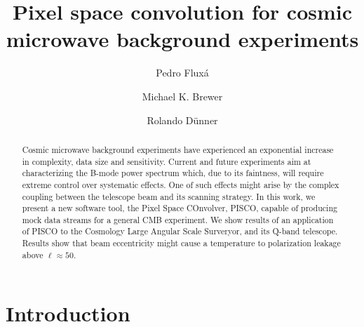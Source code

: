 \documentclass[a4paper,fleqn]{cas-dc}\sloppy
\begin{document}
	
	\let\WriteBookmarks\relax
	\def\floatpagepagefraction{1}
	\def\textpagefraction{.001}
	
	\title [mode = title]{Pixel space convolution for cosmic microwave background experiments}                      
	\tnotemark[1]
	
	\author[1]{Pedro Flux\'a}
	{
		\fnmark[1]
		\address[1]{Vicun\~na Mackenna 4860, Macul, RM, Santiago, Chile}
	}
	
	\author[2]{Michael K. Brewer}
	{
		\fnmark[2]
	}	
	
	\author[3]{Rolando D\"unner}
	{
		\fnmark[3]
		\address[3]{Vicun\~na Mackenna 4860, Macul, RM, Santiago, Chile}
	}
	
	


\begin{abstract}
Cosmic microwave background experiments have experienced an exponential increase in complexity, data size and sensitivity. Current and future experiments aim at characterizing the B-mode power spectrum which, due to its faintness, will require extreme control over systematic effects. One of such effects might arise by the complex coupling between the telescope beam and its scanning strategy. In this work, we present a new software tool, the Pixel Space COnvolver, PISCO, capable of producing mock data streams for a general CMB experiment. We show results of an application of PISCO to the Cosmology Large Angular Scale Surveryor, and its Q-band telescope. Results show that beam eccentricity might cause a temperature to polarization leakage above $\ell \approx 50$. 
\end{abstract}

\maketitle

\section{Introduction}
\end{document}
